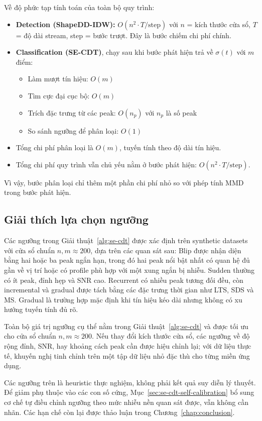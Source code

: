 Về độ phức tạp tính toán của toàn bộ quy trình:
\begin{itemize}
	\item \textbf{Detection (ShapeDD-IDW):} $O(n^2 \cdot T/\text{step})$ với $n$ = kích thước cửa sổ, $T$ = độ dài stream, step = bước trượt. Đây là bước chiếm chi phí chính.
	\item \textbf{Classification (SE-CDT)}, chạy sau khi bước phát hiện trả về $\sigma(t)$ với $m$ điểm:
	\begin{itemize}
		\item Làm mượt tín hiệu: $O(m)$
		\item Tìm cực đại cục bộ: $O(m)$
		\item Trích đặc trưng từ các peak: $O(n_p)$ với $n_p$ là số peak
		\item So sánh ngưỡng để phân loại: $O(1)$
	\end{itemize}
	\item Tổng chi phí phân loại là $O(m)$, tuyến tính theo độ dài tín hiệu.
	\item Tổng chi phí quy trình vẫn chủ yếu nằm ở bước phát hiện: $O(n^2 \cdot T/\text{step})$.
\end{itemize}

Vì vậy, bước phân loại chỉ thêm một phần chi phí nhỏ so với phép tính MMD trong bước phát hiện.

\subsection{Giải thích lựa chọn ngưỡng}
Các ngưỡng trong Giải thuật~\ref{alg:se-cdt} được xác định trên synthetic datasets với cửa sổ chuẩn $n, m \approx 200$, dựa trên các quan sát sau:
Blip được nhận diện bằng hai hoặc ba peak ngắn hạn, trong đó hai peak nổi bật nhất có quan hệ đủ gần về vị trí hoặc có profile phù hợp với một xung ngắn bị nhiễu. Sudden thường có ít peak, đỉnh hẹp và SNR cao. Recurrent có nhiều peak tương đối đều, còn incremental và gradual được tách bằng các đặc trưng thời gian như LTS, SDS và MS. Gradual là trường hợp mặc định khi tín hiệu kéo dài nhưng không có xu hướng tuyến tính đủ rõ.

Toàn bộ giá trị ngưỡng cụ thể nằm trong Giải thuật~\ref{alg:se-cdt} và được tối ưu cho cửa sổ chuẩn $n, m \approx 200$. Nếu thay đổi kích thước cửa sổ, các ngưỡng về độ rộng đỉnh, SNR, hay khoảng cách peak cần được hiệu chỉnh lại; với dữ liệu thực tế, khuyến nghị tinh chỉnh trên một tập dữ liệu nhỏ đặc thù cho từng miền ứng dụng.

Các ngưỡng trên là heuristic thực nghiệm, không phải kết quả suy diễn lý thuyết. Để giảm phụ thuộc vào các con số cứng, Mục~\ref{sec:se-cdt-self-calibration} bổ sung cơ chế tự điều chỉnh ngưỡng theo mức nhiễu nền quan sát được, vẫn không cần nhãn. Các hạn chế còn lại được thảo luận trong Chương~\ref{chap:conclusion}.

